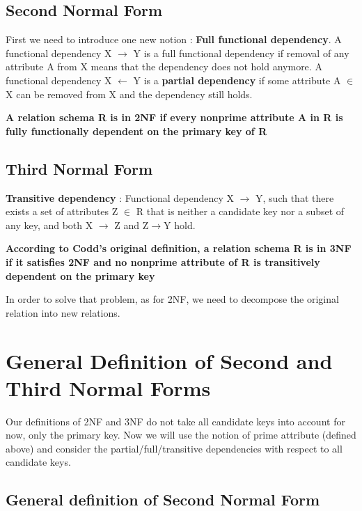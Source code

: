 \subsection{Second Normal Form}
First we need to introduce one new notion : \textbf{Full functional dependency}. A functional dependency X $\rightarrow$ Y is a full functional dependency if removal of any attribute A from X means that the dependency does not hold anymore. A functional dependency X $\leftarrow$ Y is a \textbf{partial dependency} if some attribute A $\in$ X can be removed from X and the dependency still holds.

\begin{center}
\textbf{A relation schema R is in 2NF if every nonprime attribute A in R is fully functionally dependent on the primary key of R}
\end{center}

\subsection{Third Normal Form}
\textbf{Transitive dependency} : Functional dependency X $\rightarrow$ Y, such that there exists a set of attributes Z $\in$ R that is neither a candidate key nor a subset of any key, and both X $\rightarrow$ Z and Z$\rightarrow$Y hold.

\begin{center}
\textbf{According to Codd’s original definition, a relation schema R is in 3NF if it satisfies 2NF and no nonprime attribute of R is transitively dependent on the primary key}
\end{center}

In order to solve that problem, as for 2NF, we need to decompose the original relation into new relations.

\section{General Definition of Second and Third Normal Forms}
Our definitions of 2NF and 3NF do not take all candidate keys into account for now, only the primary key. Now we will use the notion of prime attribute (defined above) and consider the partial/full/transitive dependencies with respect to all candidate keys.

\subsection{General definition of Second Normal Form}

